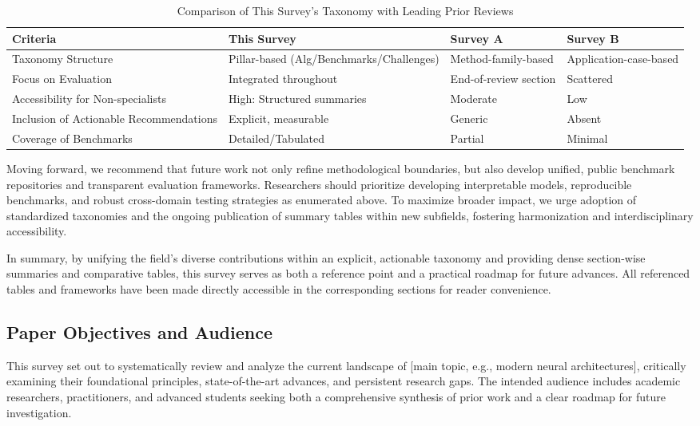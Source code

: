 \documentclass[sigconf]{acmart}
\begin{document}
\begin{table*}[htbp]
\centering
\caption{Comparison of This Survey's Taxonomy with Leading Prior Reviews}
\label{tab:taxonomy_comparison}
\begin{adjustbox}{max width=\textwidth}
\begin{tabular}{@{}llll@{}}
\toprule
Criteria & This Survey & Survey A~\cite{surveyA} & Survey B~\cite{surveyB} \\
\midrule
Taxonomy Structure & Pillar-based (Alg/Benchmarks/Challenges) & Method-family-based & Application-case-based \\
Focus on Evaluation & Integrated throughout & End-of-review section & Scattered \\
Accessibility for Non-specialists & High: Structured summaries & Moderate & Low \\
Inclusion of Actionable Recommendations & Explicit, measurable & Generic & Absent \\
Coverage of Benchmarks & Detailed/Tabulated & Partial & Minimal \\
\bottomrule
\end{tabular}
\end{adjustbox}
\end{table*}

Moving forward, we recommend that future work not only refine methodological boundaries, but also develop unified, public benchmark repositories and transparent evaluation frameworks. Researchers should prioritize developing interpretable models, reproducible benchmarks, and robust cross-domain testing strategies as enumerated above. To maximize broader impact, we urge adoption of standardized taxonomies and the ongoing publication of summary tables within new subfields, fostering harmonization and interdisciplinary accessibility.

In summary, by unifying the field’s diverse contributions within an explicit, actionable taxonomy and providing dense section-wise summaries and comparative tables, this survey serves as both a reference point and a practical roadmap for future advances. All referenced tables and frameworks have been made directly accessible in the corresponding sections for reader convenience.

\subsection{Paper Objectives and Audience}

This survey set out to systematically review and analyze the current landscape of [main topic, e.g., modern neural architectures], critically examining their foundational principles, state-of-the-art advances, and persistent research gaps. The intended audience includes academic researchers, practitioners, and advanced students seeking both a comprehensive synthesis of prior work and a clear roadmap for future investigation.
\end{document}
